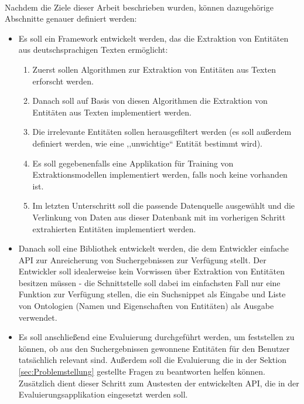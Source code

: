 \paragraph{}
Nachdem die Ziele dieser Arbeit beschrieben wurden, können dazugehörige Abschnitte genauer definiert werden: 
\begin{itemize}
\item Es soll ein Framework entwickelt werden, das die Extraktion von Entitäten aus deutschsprachigen Texten ermöglicht:
\begin{enumerate}
\item Zuerst sollen Algorithmen zur Extraktion von Entitäten aus Texten erforscht werden.
\item Danach soll auf Basis von diesen Algorithmen die Extraktion von Entitäten aus Texten implementiert werden.
\item Die irrelevante Entitäten sollen herausgefiltert werden (es soll außerdem definiert werden, wie eine ,,unwichtige`` Entität bestimmt wird).
\item Es soll gegebenenfalls eine Applikation für Training von Extraktionsmodellen implementiert werden, falls noch keine vorhanden ist.
\item Im letzten Unterschritt soll die passende Datenquelle ausgewählt und die Verlinkung von Daten aus dieser Datenbank mit im vorherigen Schritt extrahierten Entitäten implementiert werden. 
\end{enumerate}

\item Danach soll eine Bibliothek entwickelt werden, die dem Entwickler einfache API zur Anreicherung von Suchergebnissen zur Verfügung stellt. Der Entwickler soll idealerweise kein Vorwissen über Extraktion von Entitäten besitzen müssen - die Schnittstelle soll dabei im einfachsten Fall nur eine Funktion zur Verfügung stellen, die ein Suchsnippet als Eingabe und Liste von Ontologien (Namen und Eigenschaften von Entitäten) als Ausgabe verwendet.

\item Es soll anschließend eine Evaluierung durchgeführt werden, um feststellen zu können, ob aus den Suchergebnissen gewonnene Entitäten für den Benutzer tatsächlich relevant sind. Außerdem soll die Evaluierung die in der Sektion \ref{sec:Problemstellung} gestellte Fragen zu beantworten helfen können. Zusätzlich dient dieser Schritt zum Austesten der entwickelten API, die in der Evaluierungsapplikation eingesetzt werden soll.
\end{itemize}